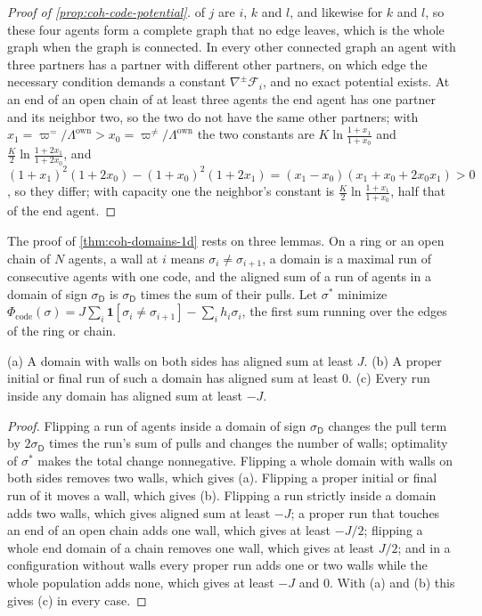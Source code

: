\begin{proof}[Proof of \cref{prop:coh-code-potential}]
of $j$ are $i$, $k$ and $l$, and likewise for $k$ and $l$, so these four agents form a complete graph that no edge leaves, which is the whole graph when the graph is connected. In every other connected graph an agent with three partners has a partner with different other partners, on which edge the necessary condition demands a constant $\nabla^{\pm}\mathcal F_i$, and no exact potential exists. At an end of an open chain of at least three agents the end agent has one partner and its neighbor two, so the two do not have the same other partners; with $x_1=\varpi^{=}/\Lambda^{\mathrm{own}}>x_0=\varpi^{\neq}/\Lambda^{\mathrm{own}}$ the two constants are $K\ln\frac{1+x_1}{1+x_0}$ and $\frac K2\ln\frac{1+2x_1}{1+2x_0}$, and $(1+x_1)^2(1+2x_0)-(1+x_0)^2(1+2x_1)=(x_1-x_0)(x_1+x_0+2x_0x_1)>0$, so they differ; with capacity one the neighbor's constant is $\frac K2\ln\frac{1+x_1}{1+x_0}$, half that of the end agent.
\end{proof}

The proof of \cref{thm:coh-domains-1d} rests on three lemmas. On a ring or an open chain of $N$ agents, a wall at $i$ means $\sigma_i\ne\sigma_{i+1}$, a domain is a maximal run of consecutive agents with one code, and the aligned sum of a run of agents in a domain of sign $\sigma_{\mathsf D}$ is $\sigma_{\mathsf D}$ times the sum of their pulls. Let $\sigma^\ast$ minimize $\Phi_{\mathrm{code}}(\sigma)=J\sum_i\mathbf 1[\sigma_i\ne\sigma_{i+1}]-\sum_ih_i\sigma_i$, the first sum running over the edges of the ring or chain.

\begin{lemma}\label{lem:coh-structure}
(a) A domain with walls on both sides has aligned sum at least $J$. (b) A proper initial or final run of such a domain has aligned sum at least $0$. (c) Every run inside any domain has aligned sum at least $-J$.
\end{lemma}

\begin{proof}
Flipping a run of agents inside a domain of sign $\sigma_{\mathsf D}$ changes the pull term by $2\sigma_{\mathsf D}$ times the run's sum of pulls and changes the number of walls; optimality of $\sigma^\ast$ makes the total change nonnegative. Flipping a whole domain with walls on both sides removes two walls, which gives (a). Flipping a proper initial or final run of it moves a wall, which gives (b). Flipping a run strictly inside a domain adds two walls, which gives aligned sum at least $-J$; a proper run that touches an end of an open chain adds one wall, which gives at least $-J/2$; flipping a whole end domain of a chain removes one wall, which gives at least $J/2$; and in a configuration without walls every proper run adds one or two walls while the whole population adds none, which gives at least $-J$ and $0$. With (a) and (b) this gives (c) in every case.
\end{proof}

